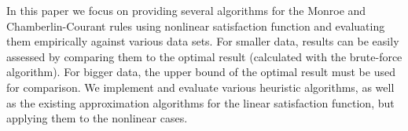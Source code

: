 In this paper we focus on providing several algorithms for the Monroe and Chamberlin-Courant rules using nonlinear satisfaction function and evaluating them empirically against various data sets. For smaller data, results can be easily assessed by comparing them to the optimal result (calculated with the brute-force algorithm). For bigger data, the upper bound of the optimal result must be used for comparison. We implement and evaluate various heuristic algorithms, as well as the existing approximation algorithms for the linear satisfaction function, but applying them to the nonlinear cases.

